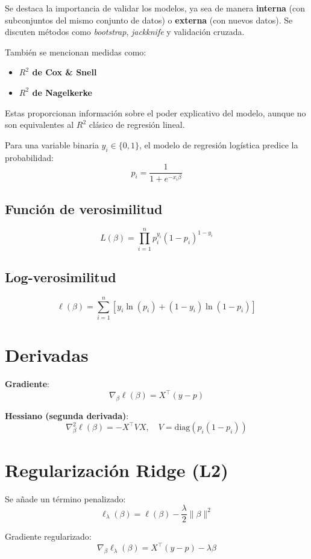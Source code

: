 \documentclass[12pt]{article}
\begin{document}
\begin{itemize}
Se destaca la importancia de validar los modelos, ya sea de manera \textbf{interna} (con subconjuntos del mismo conjunto de datos) o \textbf{externa} (con nuevos datos). Se discuten m\'etodos como \textit{bootstrap}, \textit{jackknife} y validaci\'on cruzada.

Tambi\'en se mencionan medidas como:
\begin{itemize}
  \item \textbf{$R^2$ de Cox \& Snell}
  \item \textbf{$R^2$ de Nagelkerke}
\end{itemize}
Estas proporcionan informaci\'on sobre el poder explicativo del modelo, aunque no son equivalentes al $R^2$ cl\'asico de regresi\'on lineal.
\end{itemize}



Para una variable binaria $y_i \in \{0,1\}$, el modelo de regresión logística predice la probabilidad:
\[
p_i = \frac{1}{1 + e^{-x_i \beta}}
\]

\subsection*{Función de verosimilitud}
\[
L(\beta) = \prod_{i=1}^n p_i^{y_i} (1 - p_i)^{1 - y_i}
\]

\subsection*{Log-verosimilitud}
\[
\ell(\beta) = \sum_{i=1}^n \left[ y_i \ln(p_i) + (1 - y_i) \ln(1 - p_i) \right]
\]

\section*{Derivadas}

\textbf{Gradiente}:
\[
\nabla_\beta \ell(\beta) = X^\top (y - p)
\]

\textbf{Hessiano (segunda derivada)}:
\[
\nabla^2_\beta \ell(\beta) = - X^\top V X, \quad V = \text{diag}(p_i (1 - p_i))
\]

\section*{Regularización Ridge (L2)}
Se añade un término penalizado:
\[
\ell_\lambda(\beta) = \ell(\beta) - \frac{\lambda}{2} \|\beta\|^2
\]

Gradiente regularizado:
\[
\nabla_\beta \ell_\lambda(\beta) = X^\top (y - p) - \lambda \beta
\]
\end{document}
